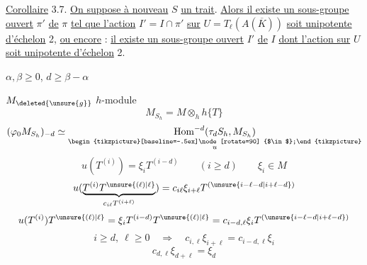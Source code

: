 \uline{Corollaire} 3.7. \uline{On suppose à nouveau} $S$ \uline{un trait}. \uline{Alors il existe un sous-groupe ouvert} $\pi'$ \uline{de} $\pi$ \uline{tel que l'action} $I'=I\cap\pi'$ \uline{sur} $U=T_\ell(A(\overline K))$ \uline{soit unipotente d'échelon} 2, \uline{ou encore} : \uline{il existe un sous-groupe ouvert} $I'$ \uline{de} $I$ \uline{dont l'action sur} $U$ \uline{soit unipotente d'échelon} 2.


$\alpha,\beta\geq0$, $d\geq\beta-\alpha$


$M_{\deleted{\unsure{g}}}$ $h$-module
\[ M_{S_h}=M\otimes_h h\{T\} \]
\[
(\varphi_0M_{S_h})_{-d}\simeq
\underset{\substack{\begin{tikzpicture}[baseline=-.5ex]\node[rotate=90] {$\in$};\end{tikzpicture}\\u}}{\operatorname{Hom}^{-d}(\tau_dS_h,M_{S_h})}
\]
\[ u(T^{(i)})=\xi_i T^{(i-d)}\qquad(i\geq d)\qquad\xi_i\in M \]
\[
u(\underbrace{T^{(i)}T^{\unsure{(\ell)|\ell}}}_{c_{i\ell}T^{(i+\ell)}})
=c_{i\ell}\xi_{i+\ell}T^{(\unsure{i-\ell-d|i+\ell-d})}
\]
\[
u(T^{(i)})T^{\unsure{(\ell)|\ell}}=\xi_i T^{(i-d)}T^{\unsure{(\ell)|\ell}}
=c_{i-d,\ell}\xi_i T^{(\unsure{i-\ell-d|i+\ell-d})}
\]
\[
i\geq d,\ \ell\geq0\quad\Longrightarrow\quad
\boxed{c_{i,\ell}\xi_{i+\ell}=c_{i-d,\ell}\xi_i}
\]
\[ c_{d,\ell}\xi_{d+\ell}=\xi_d \]

